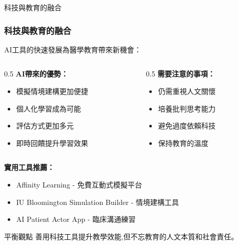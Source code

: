 \documentclass[aspectratio=169]{beamer}
\begin{document}
\begin{frame}{科技與教育的融合}
\frametitle{科技與教育的融合}

AI工具的快速發展為醫學教育帶來新機會：

\begin{columns}
\begin{column}{0.5\textwidth}
\textbf{AI帶來的優勢：}
\begin{itemize}
    \item 模擬情境建構更加便捷
    \item 個人化學習成為可能
    \item 評估方式更加多元
    \item 即時回饋提升學習效果
\end{itemize}
\end{column}

\begin{column}{0.5\textwidth}
\textbf{需要注意的事項：}
\begin{itemize}
    \item 仍需重視人文關懷
    \item 培養批判思考能力
    \item 避免過度依賴科技
    \item 保持教育的溫度
\end{itemize}
\end{column}
\end{columns}

\vspace{0.5cm}

\textbf{實用工具推薦：}
\begin{itemize}
    \item Affinity Learning - 免費互動式模擬平台
    \item IU Bloomington Simulation Builder - 情境建構工具
    \item AI Patient Actor App - 臨床溝通練習
\end{itemize}

\vspace{0.3cm}

\begin{block}{平衡觀點}
善用科技工具提升教學效能,但不忘教育的人文本質和社會責任。
\end{block}
\end{frame}
\end{document}
